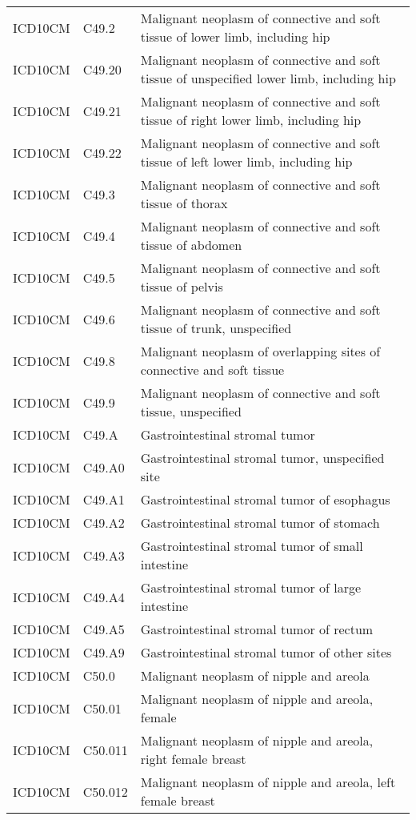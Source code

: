 \begin{longtable}{p{}p{}p{}}
  ICD10CM & C49.2 & Malignant neoplasm of connective and soft tissue of lower limb, including hip \\ 
  ICD10CM & C49.20 & Malignant neoplasm of connective and soft tissue of unspecified lower limb, including hip \\ 
  ICD10CM & C49.21 & Malignant neoplasm of connective and soft tissue of right lower limb, including hip \\ 
  ICD10CM & C49.22 & Malignant neoplasm of connective and soft tissue of left lower limb, including hip \\ 
  ICD10CM & C49.3 & Malignant neoplasm of connective and soft tissue of thorax \\ 
  ICD10CM & C49.4 & Malignant neoplasm of connective and soft tissue of abdomen \\ 
  ICD10CM & C49.5 & Malignant neoplasm of connective and soft tissue of pelvis \\ 
  ICD10CM & C49.6 & Malignant neoplasm of connective and soft tissue of trunk, unspecified \\ 
  ICD10CM & C49.8 & Malignant neoplasm of overlapping sites of connective and soft tissue \\ 
  ICD10CM & C49.9 & Malignant neoplasm of connective and soft tissue, unspecified \\ 
  ICD10CM & C49.A & Gastrointestinal stromal tumor \\ 
  ICD10CM & C49.A0 & Gastrointestinal stromal tumor, unspecified site \\ 
  ICD10CM & C49.A1 & Gastrointestinal stromal tumor of esophagus \\ 
  ICD10CM & C49.A2 & Gastrointestinal stromal tumor of stomach \\ 
  ICD10CM & C49.A3 & Gastrointestinal stromal tumor of small intestine \\ 
  ICD10CM & C49.A4 & Gastrointestinal stromal tumor of large intestine \\ 
  ICD10CM & C49.A5 & Gastrointestinal stromal tumor of rectum \\ 
  ICD10CM & C49.A9 & Gastrointestinal stromal tumor of other sites \\ 
  ICD10CM & C50.0 & Malignant neoplasm of nipple and areola \\ 
  ICD10CM & C50.01 & Malignant neoplasm of nipple and areola, female \\ 
  ICD10CM & C50.011 & Malignant neoplasm of nipple and areola, right female breast \\ 
  ICD10CM & C50.012 & Malignant neoplasm of nipple and areola, left female breast \\ 

\end{longtable}
